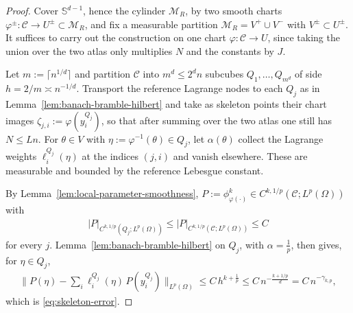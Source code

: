 \documentclass[12pt]{article}
\numberwithin{equation}{section}
\numberwithin{figure}{section}
\numberwithin{equation}{section}
\newcommand{\Sph}{\mathbb S}
\newcommand{\Ccal}{\mathcal C}
\newcommand{\MR}{\mathcal M_R}
\newcommand{\abs}[1]{\left|#1\right|}
\begin{document}
\begin{proof}
Cover $\Sph^{d-1}$, hence the cylinder $\MR$, by two smooth charts
$\varphi^\pm:\Ccal\to U^\pm\subset\MR$, and fix a measurable partition
$\MR=V^+\cup V^-$ with $V^\pm\subset U^\pm$.
It suffices to carry out the construction on one chart $\varphi:\Ccal\to U$,
since taking the union over the two atlas only multiplies $N$ and the
constants by $J$.

Let $m:=\lceil n^{1/d}\rceil$ and partition $\Ccal$ into $m^d\le 2^d n$ subcubes
$Q_1,\dots,Q_{m^d}$ of side $h=2/m\asymp n^{-1/d}$. Transport the reference
Lagrange nodes to each $Q_j$ as in Lemma~\ref{lem:banach-bramble-hilbert} and take
as skeleton points their chart images $\zeta_{j,i}:=\varphi(y_i^{Q_j})$, so that
after summing over the two atlas one still has $N\le Ln$. For $\theta\in V$
with $\eta:=\varphi^{-1}(\theta)\in Q_j$, let $\alpha(\theta)$ collect the
Lagrange weights $\ell_i^{Q_j}(\eta)$ at the indices $(j,i)$ and vanish elsewhere.
These are measurable and bounded by the reference Lebesgue constant.

By Lemma~\ref{lem:local-parameter-smoothness},
$P:=\phi^k_{\varphi(\cdot)}\in C^{k,1/p}(\Ccal;L^p(\Omega))$ with
\begin{align*}
    \abs{P}_{C^{k,1/p}(Q_j;L^p(\Omega))}
    \le\abs{P}_{C^{k,1/p}(\Ccal;L^p(\Omega))}\le C
\end{align*}
for every $j$. Lemma~\ref{lem:banach-bramble-hilbert} on $Q_j$, with
$\alpha=\tfrac1p$, then gives, for $\eta\in Q_j$,
\begin{align*}
    \Big\|P(\eta)-\sum_i\ell_i^{Q_j}(\eta)\,P(y_i^{Q_j})\Big\|_{L^p(\Omega)}
    \le C\,h^{k+\frac1p}
    \le C\,n^{-\frac{k+1/p}{d}}=C\,n^{-\gamma_{k,p}},
\end{align*}
which is \eqref{eq:skeleton-error}.
\end{proof}

\end{document}
